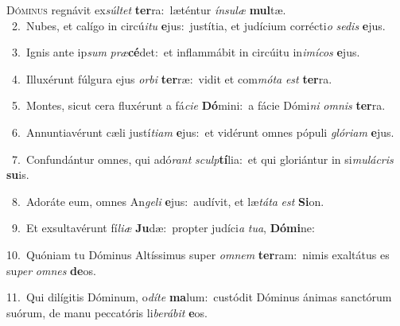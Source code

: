 \lettrine{\initial\textcolor{\initialcolor}{D}}{óminus} regnávit ex\-\textit{súl}\-\textit{tet} \textbf{ter}\-ra:~\star læténtur \textit{ín}\-\textit{su}\textit{læ} \textbf{mul}\-tæ.\\
{\numbfont\textcolor{\numbcolor}{~2.}}~Nubes, et calígo in circú\-\textit{i}\-\textit{tu} \textbf{e}\-jus:~\star justítia, et judícium corrécti\textit{o} \textit{se}\-\textit{dis} \textbf{e}\-jus.\par
{\numbfont\textcolor{\numbcolor}{~3.}}~Ignis ante ip\textit{sum} \textit{præ}\-\textbf{cé}det:~\star et inflammábit in circúitu in\-\textit{i}\-\textit{mí}\textit{cos} \textbf{e}\-jus.\par
{\numbfont\textcolor{\numbcolor}{~4.}}~Illuxérunt fúlgura ejus \textit{or}\-\textit{bi} \textbf{ter}\-ræ:~\star vidit et com\-\textit{mó}\-\textit{ta} \textit{est} \textbf{ter}\-ra.\par
{\numbfont\textcolor{\numbcolor}{~5.}}~Montes, sicut cera fluxérunt a fá\-\textit{ci}\-\textit{e} \textbf{Dó}\-mini:~\star a fácie Dómi\textit{ni} \textit{om}\-\textit{nis} \textbf{ter}\-ra.\par
{\numbfont\textcolor{\numbcolor}{~6.}}~Annuntiavérunt cæli justí\-\textit{ti}\-\textit{am} \textbf{e}\-jus:~\star et vidérunt omnes pópuli \textit{gló}\-\textit{ri}\textit{am} \textbf{e}\-jus.\par
{\numbfont\textcolor{\numbcolor}{~7.}}~Confundántur omnes, qui adó\textit{rant} \textit{sculp}\-\textbf{tí}lia:~\star et qui gloriántur in si\-\textit{mu}\-\textit{lá}\textit{cris} \textbf{su}\-is.\par
{\numbfont\textcolor{\numbcolor}{~8.}}~Adoráte eum, omnes An\-\textit{ge}\-\textit{li} \textbf{e}\-jus:~\star audívit, et læ\-\textit{tá}\-\textit{ta} \textit{est} \textbf{Si}\-on.\par
{\numbfont\textcolor{\numbcolor}{~9.}}~Et exsultavérunt fí\-\textit{li}\-\textit{æ} \textbf{Ju}\-dæ:~\star propter judíci\textit{a} \textit{tu}\-\textit{a}, \textbf{Dó}\-\textbf{mi}ne:\par
{\numbfont\textcolor{\numbcolor}{10.}}~Quóniam tu Dóminus Altíssimus super \textit{om}\-\textit{nem} \textbf{ter}\-ram:~\star nimis exaltátus es su\textit{per} \textit{om}\-\textit{nes} \textbf{de}\-os.\par
{\numbfont\textcolor{\numbcolor}{11.}}~Qui dilígitis Dóminum, o\-\textit{dí}\-\textit{te} \textbf{ma}\-lum:~\star custódit Dóminus ánimas sanctórum suórum, de manu peccatóris li\-\textit{be}\-\textit{rá}\textit{bit} \textbf{e}\-os.\par

